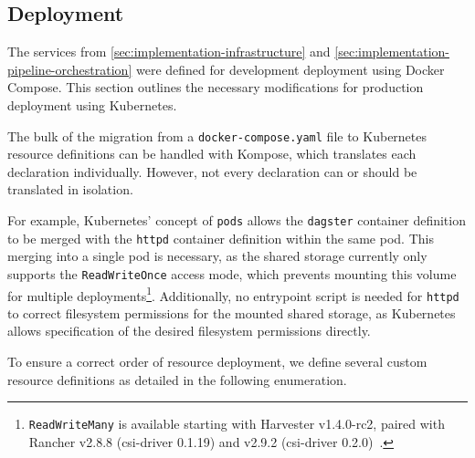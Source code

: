 \subsection{Deployment}
\label{sec:implementation-deployment}

The services from \cref{sec:implementation-infrastructure} and \cref{sec:implementation-pipeline-orchestration} were defined for development deployment using Docker Compose.
This section outlines the necessary modifications for production deployment using Kubernetes.

The bulk of the migration from a \texttt{docker-compose.yaml} file to Kubernetes resource definitions can be handled with Kompose, which translates each declaration individually.
However, not every declaration can or should be translated in isolation.

For example, Kubernetes' concept of \texttt{pods} allows the \texttt{dagster} container definition to be merged with the \texttt{httpd} container definition within the same pod.
This merging into a single pod is necessary, as the shared storage currently only supports the \texttt{ReadWriteOnce} access mode, which prevents mounting this volume for multiple deployments\footnote{\texttt{ReadWriteMany} is available starting with Harvester v1.4.0-rc2, paired with Rancher v2.8.8 (csi-driver 0.1.19) and v2.9.2 (csi-driver 0.2.0)~\cite{TachunLin2024}.}.
Additionally, no entrypoint script is needed for \texttt{httpd} to correct filesystem permissions for the mounted shared storage, as Kubernetes allows specification of the desired filesystem permissions directly.

To ensure a correct order of resource deployment, we define several custom resource definitions as detailed in the following enumeration.

